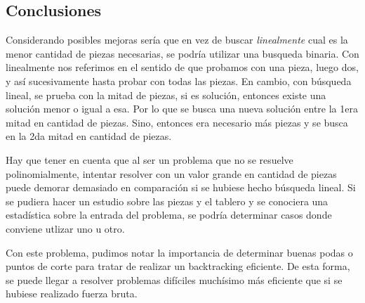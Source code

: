 \subsection{Conclusiones}

\quad Considerando posibles mejoras ser\'ia que en vez de buscar \textit{linealmente} cual es la menor cantidad de piezas necesarias, se podr\'ia utilizar una busqueda binaria. Con linealmente nos referimos en el sentido de que probamos con una pieza, luego dos, y así sucesivamente hasta probar con todas las piezas. En cambio, con b\'usqueda lineal, se prueba con la mitad de piezas, si es soluci\'on, entonces existe una soluci\'on menor o igual a esa. Por lo que se busca una nueva soluci\'on entre la 1era mitad en cantidad de piezas. Sino, entonces era necesario m\'as piezas y se busca en la 2da mitad en cantidad de piezas.

\quad Hay que tener en cuenta que al ser un problema que no se resuelve polinomialmente, intentar resolver con un valor grande en cantidad de piezas puede demorar demasiado en comparaci\'on si se hubiese hecho b\'usqueda lineal. Si se pudiera hacer un estudio sobre las piezas y el tablero y se conociera una estad\'istica sobre la entrada del problema, se podr\'ia determinar casos donde conviene utlizar uno u otro.

\quad Con este problema, pudimos notar la importancia de determinar buenas podas o puntos de corte para tratar de realizar un backtracking eficiente. De esta forma, se puede llegar a resolver problemas dif\'iciles much\'isimo m\'as eficiente que si se hubiese realizado fuerza bruta.
